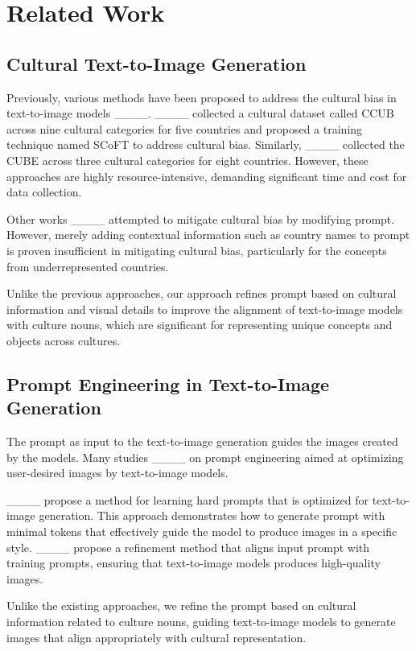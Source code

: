 \section{Related Work}
\subsection{Cultural Text-to-Image Generation}
Previously, various methods have been proposed to address the cultural bias in text-to-image models ____. ____ collected a cultural dataset called CCUB across nine cultural categories for five countries and proposed a training technique named SCoFT to address cultural bias. Similarly, ____ collected the CUBE across three cultural categories for eight countries. However, these approaches are highly resource-intensive, demanding significant time and cost for data collection.

Other works ____ attempted to mitigate cultural bias by modifying prompt. However, merely adding contextual information such as country names to prompt is proven insufficient in mitigating cultural bias, particularly for the concepts from underrepresented countries.

Unlike the previous approaches, our approach refines prompt based on cultural information and visual details to improve the alignment of text-to-image models with culture nouns, which are significant for representing unique concepts and objects across cultures.

\subsection{Prompt Engineering in Text-to-Image Generation}
The prompt as input to the text-to-image generation guides the images created by the models. Many studies ____ on prompt engineering aimed at optimizing user-desired images by text-to-image models.

____ propose a method for learning hard prompts that is optimized for text-to-image generation. This approach demonstrates how to generate prompt with minimal tokens that effectively guide the model to produce images in a specific style. ____ propose a refinement method that aligns input prompt with training prompts, ensuring that text-to-image models produces high-quality images.

 Unlike the existing approaches, we refine the prompt based on cultural information related to culture nouns, guiding text-to-image models to generate images that align appropriately with cultural representation.

